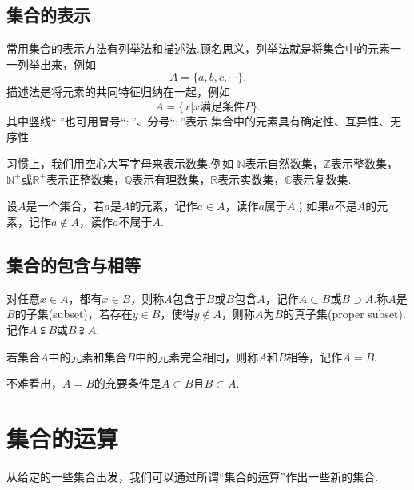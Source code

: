 \subsection{集合的表示}
常用集合的表示方法有{\heiti 列举法}和{\heiti 描述法}.顾名思义，列举法就是将集合中的元素一一列举出来，例如
$$A=\{a,b,c,\cdots\}.$$
描述法是将元素的共同特征归纳在一起，例如
$$A=\{x|x\text{满足条件}P\}.$$
其中竖线“$|$”也可用冒号“$:$”、分号“$;$”表示.集合中的元素具有确定性、互异性、无序性.

习惯上，我们用空心大写字母来表示数集.例如
$\mathbb{N}$表示{\heiti 自然数集}，$\mathbb{Z}$表示{\heiti 整数集}，$\mathbb{N}^+$或$\mathbb{R}^+$表示{\heiti 正整数集}，$\mathbb{Q}$表示有理数集，$\mathbb{R}$表示{\heiti 实数集}，$\mathbb{C}$表示{\heiti 复数集}.

设$A$是一个集合，若$a$是$A$的元素，记作$a\in A$，读作{\heiti $a$属于$A$}；如果$a$不是$A$的元素，记作$a\notin A$，读作{\heiti $a$不属于$A$}.
\subsection{集合的包含与相等}
\begin{definition}[包含与子集]
	对任意$x\in A$，都有$x\in B$，则称{\heiti $A$包含于$B$}或{\heiti $B$包含$A$}，记作$A\subset B$或$B\supset A$.称$A$是$B$的{\heiti 子集}(subset)，若存在$y\in B$，使得$y\notin A$，则称$A$为$B$的{\heiti 真子集}(proper subset).记作$A\subsetneqq B$或$B\supsetneqq A$.
\end{definition}
\begin{definition}[集合的相等]
	若集合$A$中的元素和集合$B$中的元素完全相同，则称$A$和$B$相等，记作$A=B$.
\end{definition}
不难看出，$A=B$的充要条件是$A\subset B$且$B\subset A$.
\section{集合的运算}
从给定的一些集合出发，我们可以通过所谓“集合的运算”作出一些新的集合.
